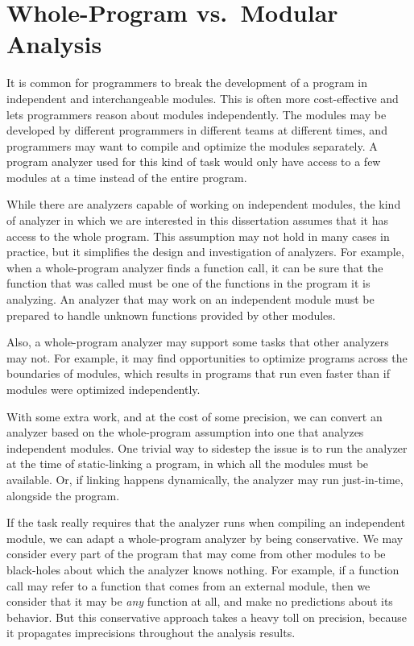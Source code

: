 \documentclass[12pt, oneside]{book}
\begin{document}
\section{Whole-Program vs.\ Modular Analysis}

It is common for programmers to break the development of a program in independent and interchangeable modules. This is often more cost-effective and lets programmers reason about modules independently. The modules may be developed by different programmers in different teams at different times, and programmers may want to compile and optimize the modules separately. A program analyzer used for this kind of task would only have access to a few modules at a time instead of the entire program.

While there are analyzers capable of working on independent modules, the kind of analyzer in which we are interested in this dissertation assumes that it has access to the whole program. This assumption may not hold in many cases in practice, but it simplifies the design and investigation of analyzers. For example, when a whole-program analyzer finds a function call, it can be sure that the function that was called must be one of the functions in the program it is analyzing. An analyzer that may work on an independent module must be prepared to handle unknown functions provided by other modules.

Also, a whole-program analyzer may support some tasks that other analyzers may not. For example, it may find opportunities to optimize programs across the boundaries of modules, which results in programs that run even faster than if modules were optimized independently.

With some extra work, and at the cost of some precision, we can convert an analyzer based on the whole-program assumption into one that analyzes independent modules. One trivial way to sidestep the issue is to run the analyzer at the time of static-linking a program, in which all the modules must be available. Or, if linking happens dynamically, the analyzer may run just-in-time, alongside the program.

If the task really requires that the analyzer runs when compiling an independent module, we can adapt a whole-program analyzer by being conservative. We may consider every part of the program that may come from other modules to be black-holes about which the analyzer knows nothing. For example, if a function call may refer to a function that comes from an external module, then we consider that it may be \emph{any} function at all, and make no predictions about its behavior. But this conservative approach takes a heavy toll on precision, because it propagates imprecisions throughout the analysis results.
\end{document}
